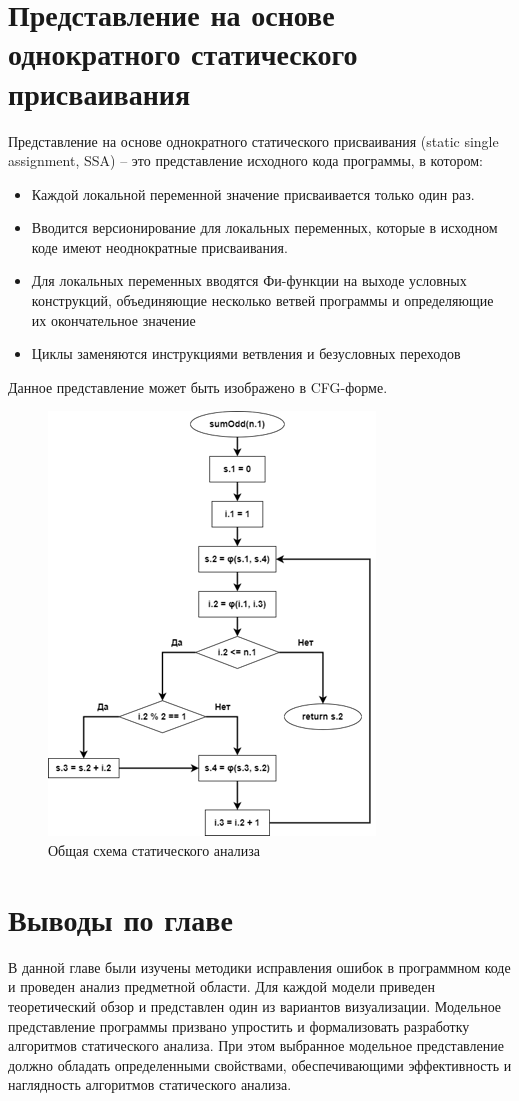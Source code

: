 \section{Представление на основе однократного статического присваивания} \label{ch1:sec2-abbr6}
Представление на основе однократного статического присваивания (static single assignment, SSA) – это представление исходного кода программы, в котором:
\begin{itemize}
\item Каждой локальной переменной значение присваивается только один раз.
\item Вводится версионирование для локальных переменных, которые в исходном коде имеют неоднократные присваивания.
\item Для локальных переменных вводятся Фи-функции на выходе условных конструкций, объединяющие несколько ветвей программы и определяющие их окончательное значение
\item Циклы заменяются инструкциями ветвления и безусловных переходов
\end{itemize}
Данное представление может быть изображено в CFG-форме.
\begin{figure}[ht!] 
	\center
	\includegraphics [scale=1] {my_folder/images/my/7}
	\caption{Общая схема статического анализа } 
	\label{fig:7}  
\end{figure}
\section{Выводы по главе} \label{ch1:sec3}
В данной главе были изучены методики исправления ошибок в программном коде и проведен анализ предметной области. Для каждой модели приведен теоретический обзор и представлен один из вариантов визуализации. Модельное представление программы призвано упростить и формализовать разработку алгоритмов статического анализа. При этом выбранное модельное представление должно обладать определенными свойствами, обеспечивающими эффективность и наглядность алгоритмов статического анализа.


